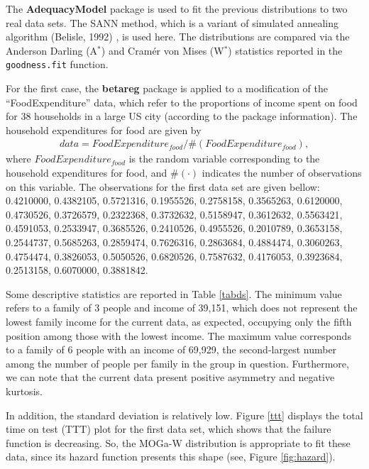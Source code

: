 \documentclass[twoside,leqno,11pt]{article}
\begin{document}
The {\bf AdequacyModel} package is used to fit the 
previous distributions to two real data sets. The SANN method, which is a variant of simulated annealing algorithm (Belisle, 1992) \cite{Belisle}, is used here. The distributions are compared 
via the Anderson Darling (A$^{*}$) and Cram\'er von Mises (W$^{*}$) statistics reported in the {\tt goodness.fit} function.

For the first case, the {\bf betareg} package is applied to a modification of the ``FoodExpenditure'' data, which refer to 
the proportions of income spent on food for 38 households 
in a large US city (according to the package information). The household expenditures for food are given by
\begin{eqnarray*}
data = FoodExpenditure_{food} / \#(FoodExpenditure_{food}),
\end{eqnarray*}
where $FoodExpenditure_{food}$ is the random variable 
corresponding to the household expenditures for food, and $\#(\cdot)$ indicates the number of observations on this variable. The observations for the first data set are given bellow:\\
  0.4210000, 0.4382105, 0.5721316, 0.1955526, 0.2758158, 0.3565263,
  0.6120000, 0.4730526, 0.3726579, 0.2322368, 0.3732632, 0.5158947,
  0.3612632, 0.5563421, 0.4591053, 0.2533947, 0.3685526, 0.2410526,
  0.4955526, 0.2010789, 0.3653158, 0.2544737, 0.5685263, 0.2859474,
  0.7626316, 0.2863684, 0.4884474, 0.3060263, 0.4754474, 0.3826053,
  0.5050526, 0.6820526, 0.7587632, 0.4176053, 0.3923684, 0.2513158,
  0.6070000, 0.3881842.
  
Some descriptive statistics are reported in Table \ref{tabds}. The minimum value refers to a family of 3 people and income of 39,151, which does not represent the lowest family 
income for the current data, as expected, occupying only the 
fifth position among those with the lowest income. The maximum value corresponds to a family of 6 people with an income of 69,929, the second-largest number among the number of people per family in the group in question. Furthermore, we can note that the current data  present positive asymmetry and negative kurtosis.

In addition, the standard deviation is relatively low. Figure \ref{ttt} displays the total time on test (TTT) plot for the first data set, which shows that the failure function is decreasing. So, the MOGa-W distribution is appropriate to fit 
these data, since its  hazard function presents this shape (see,  Figure \ref{fig:hazard}).
\end{document}
